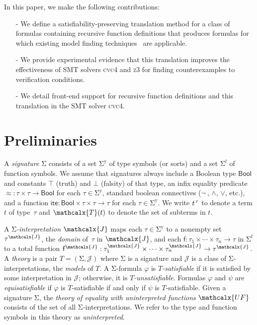 \documentclass[runningheads,a4paper]{llncs}
\newcommand{\con}[1]{\mathsf{#1}}
\let\oldSigma=\Sigma
\def\Sigma{\mathrm{\oldSigma}}
\let\oldneg=\neg
\def\neg{\oldneg\:}
\newcommand{\cvc}{\textsc{cvc}{\small 4}\xspace}
\newcommand{\ziii}{\textsc{z}{\small 3}\xspace}
\newcommand{\teq}{\approx}
\newcommand{\terms}{\mathcalx{T}}
\newcommand{\I}{\mathcalx{J}} %
\newcommand{\ssorts}[1]{#1^\mathrm{y}}
\newcommand{\sfuns}[1]{#1^\mathrm{f}}
\newcommand{\sfundefs}[1]{#1^\mathrm{df}}
\newcommand{\Bool}{\con{Bool}}
\newcommand{\ltrue}{\top}
\newcommand{\lfalse}{\bot}
\newcommand{\lite}{\con{ite}}
\newcommand{\vthinspace}{\kern+0.083333em}
\newcommand{\typ}[1]{^{\vthinspace #1}}
\newcommand{\Mo}{{\mathcal{\!J\!}}}
\newcommand{\euf}{\ensuremath{\mathcalx{UF}}\xspace}
\begin{document}
In this paper, we make the following contributions:
\begin{itemize}
\item[-] We define a satisfiability-preserving translation method for a class of formulas containing recursive function definitions
that produces formulas for which existing model finding techniques~\cite{GeDeM-CAV-09, ReyEtAl-1-RR-13} are applicable.
\item[-] We provide experimental evidence that this translation improves the effectiveness of SMT solvers \cvc and \ziii for finding counterexamples to verification conditions.
\item[-] We detail front-end support for recursive function definitions and this translation in the SMT solver \cvc.
\end{itemize}

\section{Preliminaries}
\label{sec:prelim}

A \emph{signature} $\Sigma$ consists of 
a set $\ssorts{\Sigma}$ of type symbols (or sorts) and
a set $\sfuns{\Sigma}$ of function symbols.
We assume that signatures always include a Boolean type $\Bool$ and constants 
$\ltrue$ (truth) and $\lfalse$ (falsity) of that type,
an infix equality predicate ${\teq} : \tau \times \tau \to \Bool$
for each $\tau \in \ssorts{\Sigma}$,
standard boolean connectives ($\neg$, $\wedge$, $\vee$, etc.),
and a function $\lite : \Bool \times \tau \times \tau \rightarrow \tau$ for each $\tau \in \ssorts{\Sigma}$.
We write $t\typ{\tau}$ to denote a term $t$ of type~$\tau$ and
$\terms( t )$ to denote the set of subterms in $t$.

A \emph{$\Sigma$-interpretation $\I$} %
maps each $\tau \in \ssorts{\Sigma}$ to a nonempty set $\tau^\I$,
the \emph{domain} of~$\tau$ in $\I$,
and each $\con{f} : \tau_1 \times \cdots \times \tau_n \rightarrow \tau$ in
$\sfuns{\Sigma}$ 
to a total function $\con{f}^\I : \tau_1^\I \times \cdots \times \tau_n^\I \rightarrow \tau^\I$.
A \emph{theory} is a pair $T = (\Sigma, \Mo)$ where 
$\Sigma$ is a signature and  $\Mo$ is a class of $\Sigma$-interpretations,
the \emph{models} of $T$.
A $\Sigma$-formula $\varphi$ is 
\emph{$T$-satisfiable}
if it is satisfied by some interpretation in $\Mo$;
otherwise, it is \emph{$T$-unsatisfiable}.
Formulas $\varphi$ and $\psi$ are \emph{equisatisfiable} if
$\varphi$ is $T$-satisfiable if and only if $\psi$ is $T$-satisfiable.
Given a signature $\Sigma$,
the \emph{theory of equality with uninterpreted functions} \euf
consists of the set of all $\Sigma$-interpretations.
We refer to the type and function symbols in this theory as \emph{uninterpreted}.
\end{document}
